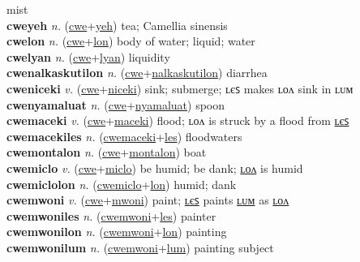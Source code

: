 mist \label{cweufalon} \\
\textbf{cweyeh} \textit{n.} (\hyperref[cwe]{cwe}+\hyperref[yeh]{yeh})
tea; Camellia sinensis \label{cweyeh} \\
\textbf{cwelon} \textit{n.} (\hyperref[cwe]{cwe}+\hyperref[lon]{lon})
body of water; liquid; water \label{cwelon} \\
\textbf{cwelyan} \textit{n.} (\hyperref[cwe]{cwe}+\hyperref[lyan]{lyan})
liquidity \label{cwelyan} \\
\textbf{cwenalkaskutilon} \textit{n.} (\hyperref[cwe]{cwe}+\hyperref[nalkaskutilon]{nalkaskutilon})
diarrhea \label{cwenalkaskutilon} \\
\textbf{cweniceki} \textit{v.} (\hyperref[cwe]{cwe}+\hyperref[niceki]{niceki})
sink; submerge; ʟєꜱ makes ʟᴏᴧ sink in ʟᴜᴍ \label{cweniceki} \\
\textbf{cwenyamaluat} \textit{n.} (\hyperref[cwe]{cwe}+\hyperref[nyamaluat]{nyamaluat})
spoon \label{cwenyamaluat} \\
\textbf{cwemaceki} \textit{v.} (\hyperref[cwe]{cwe}+\hyperref[maceki]{maceki})
flood; ʟᴏᴧ is struck by a flood from \hyperref[cwemacekiles]{ʟєꜱ} \label{cwemaceki} \\
\textbf{cwemacekiles} \textit{n.} (\hyperref[cwemaceki]{cwemaceki}+\hyperref[les]{les})
floodwaters \label{cwemacekiles} \\
\textbf{cwemontalon} \textit{n.} (\hyperref[cwe]{cwe}+\hyperref[montalon]{montalon})
boat \label{cwemontalon} \\
\textbf{cwemiclo} \textit{v.} (\hyperref[cwe]{cwe}+\hyperref[miclo]{miclo})
be humid; be dank; \hyperref[cwemiclolon]{ʟᴏᴧ} is humid \label{cwemiclo} \\
\textbf{cwemiclolon} \textit{n.} (\hyperref[cwemiclo]{cwemiclo}+\hyperref[lon]{lon})
humid; dank \label{cwemiclolon} \\
\textbf{cwemwoni} \textit{v.} (\hyperref[cwe]{cwe}+\hyperref[mwoni]{mwoni})
paint; \hyperref[cwemwoniles]{ʟєꜱ} paints \hyperref[cwemwonilum]{ʟᴜᴍ} as \hyperref[cwemwonilon]{ʟᴏᴧ} \label{cwemwoni} \\
\textbf{cwemwoniles} \textit{n.} (\hyperref[cwemwoni]{cwemwoni}+\hyperref[les]{les})
painter \label{cwemwoniles} \\
\textbf{cwemwonilon} \textit{n.} (\hyperref[cwemwoni]{cwemwoni}+\hyperref[lon]{lon})
painting \label{cwemwonilon} \\
\textbf{cwemwonilum} \textit{n.} (\hyperref[cwemwoni]{cwemwoni}+\hyperref[lum]{lum})
painting subject \label{cwemwonilum} \\
